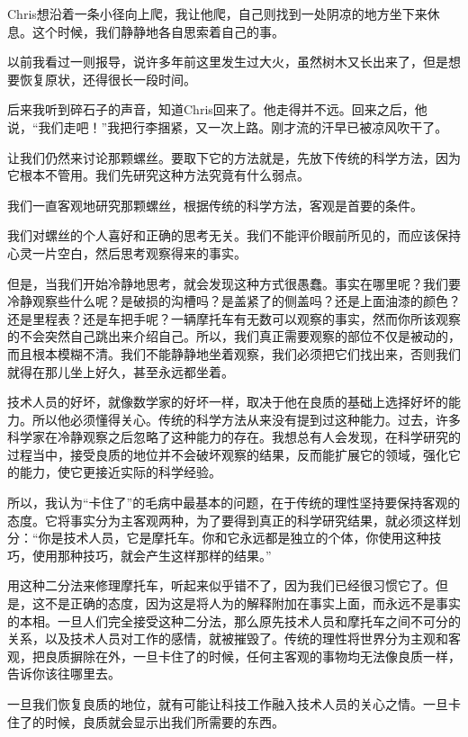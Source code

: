 \documentclass[UTF8]{article}
\begin{document}
\par Chris想沿着一条小径向上爬，我让他爬，自己则找到一处阴凉的地方坐下来休息。这个时候，我们静静地各自思索着自己的事。
\par 以前我看过一则报导，说许多年前这里发生过大火，虽然树木又长出来了，但是想要恢复原状，还得很长一段时间。
\par 后来我听到碎石子的声音，知道Chris回来了。他走得并不远。回来之后，他说，“我们走吧！”我把行李捆紧，又一次上路。刚才流的汗早已被凉风吹干了。
\par 让我们仍然来讨论那颗螺丝。要取下它的方法就是，先放下传统的科学方法，因为它根本不管用。我们先研究这种方法究竟有什么弱点。
\par 我们一直客观地研究那颗螺丝，根据传统的科学方法，客观是首要的条件。
\par 我们对螺丝的个人喜好和正确的思考无关。我们不能评价眼前所见的，而应该保持心灵一片空白，然后思考观察得来的事实。
\par 但是，当我们开始冷静地思考，就会发现这种方式很愚蠢。事实在哪里呢？我们要冷静观察些什么呢？是破损的沟槽吗？是盖紧了的侧盖吗？还是上面油漆的颜色？还是里程表？还是车把手呢？一辆摩托车有无数可以观察的事实，然而你所该观察的不会突然自己跳出来介绍自己。所以，我们真正需要观察的部位不仅是被动的，而且根本模糊不清。我们不能静静地坐着观察，我们必须把它们找出来，否则我们就得在那儿坐上好久，甚至永远都坐着。
\par 技术人员的好坏，就像数学家的好坏一样，取决于他在良质的基础上选择好坏的能力。所以他必须懂得关心。传统的科学方法从来没有提到过这种能力。过去，许多科学家在冷静观察之后忽略了这种能力的存在。我想总有人会发现，在科学研究的过程当中，接受良质的地位并不会破坏观察的结果，反而能扩展它的领域，强化它的能力，使它更接近实际的科学经验。
\par 所以，我认为“卡住了”的毛病中最基本的问题，在于传统的理性坚持要保持客观的态度。它将事实分为主客观两种，为了要得到真正的科学研究结果，就必须这样划分：“你是技术人员，它是摩托车。你和它永远都是独立的个体，你使用这种技巧，使用那种技巧，就会产生这样那样的结果。”
\par 用这种二分法来修理摩托车，听起来似乎错不了，因为我们已经很习惯它了。但是，这不是正确的态度，因为这是将人为的解释附加在事实上面，而永远不是事实的本相。一旦人们完全接受这种二分法，那么原先技术人员和摩托车之间不可分的关系，以及技术人员对工作的感情，就被摧毁了。传统的理性将世界分为主观和客观，把良质摒除在外，一旦卡住了的时候，任何主客观的事物均无法像良质一样，告诉你该往哪里去。
\par 一旦我们恢复良质的地位，就有可能让科技工作融入技术人员的关心之情。一旦卡住了的时候，良质就会显示出我们所需要的东西。
\end{document}
